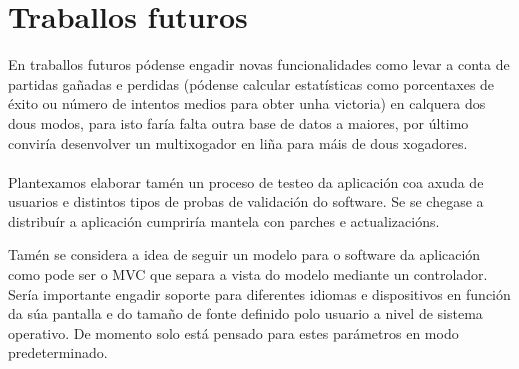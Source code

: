 \section{Traballos futuros}
En traballos futuros pódense engadir novas funcionalidades como levar a conta de partidas gañadas e perdidas (pódense calcular estatísticas como porcentaxes de éxito ou número de intentos medios para obter unha victoria) en calquera dos dous modos, para isto faría falta outra base de datos a maiores, por último conviría desenvolver un multixogador en liña para máis de dous xogadores.\\
\\
Plantexamos elaborar tamén un proceso de testeo da aplicación coa axuda de usuarios e distintos tipos de probas de validación do software. Se se chegase a distribuír a aplicación cumpriría mantela con parches e actualizacións.

Tamén se considera a idea de seguir un modelo para o software da aplicación como pode ser o MVC que separa a vista do modelo mediante un controlador. Sería importante engadir soporte para diferentes idiomas e dispositivos en función da súa pantalla e do tamaño de fonte definido polo usuario a nivel de sistema operativo. De momento solo está pensado para estes parámetros en modo predeterminado.
 \let\cleardoublepage=\clearpage 